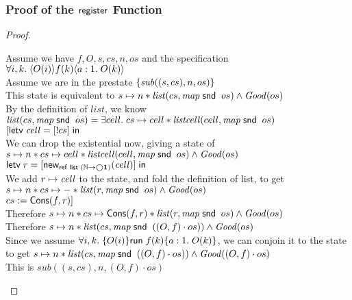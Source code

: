 \subsubsection{Proof of the $\mathsf{register}$ Function}
\begin{proof}
\begin{tabbedproof}
\oo Assume we have $f, O, s, cs, n, os$ and the specification $\forall i,k.\;\langle{O(i)}\rangle{{f(k)}}\langle{a:1}.\;{O(k)}\rangle$ \\
\ooo Assume we are in the prestate $\{{\mathit{sub}((s,cs), n, os)}\}$ \\
\ooo This state is equivalent to $s \mapsto n * \mathit{list}(cs, \mathit{map}\;\mathsf{snd}\;\;os) \land \mathit{Good}(os)$ \\
\ooo By the definition of $\mathit{list}$, we know \\
\ooox $\mathit{list}(cs, \mathit{map}\;\mathsf{snd}\;\;os) = \exists cell.\;cs \mapsto cell * \mathit{listcell}(cell, \mathit{map}\;\mathsf{snd}\;\;os)$ \\
\ooo $[\mathsf{letv}\;\mathit{cell} = [!cs]\;\mathsf{in}\;$ \\
\ooo We can drop the existential now, giving a state of \\
\ooox $s \mapsto n * cs \mapsto cell * \mathit{listcell}(cell, \mathit{map}\;\mathsf{snd}\;\;os) \land \mathit{Good}(os)$ \\
\ooo $\mathsf{letv}\;r = [\mathsf{new}_{\mathsf{ref}\;\mathsf{list}\;{(\mathbb{N} \to \bigcirc{\mathbf{1}})}}(\mathit{cell})]\;\mathsf{in}\;$ \\
\ooo We add $r \mapsto \mathit{cell}$ to the state, and fold the definition of list, to get \\
\ooox $s \mapsto n * cs \mapsto - * \mathit{list}(r, \mathit{map}\;\mathsf{snd}\;\;os) \land \mathit{Good}(os)$ \\ 
\ooo $cs := \mathsf{Cons}(f, r)]$ \\
\ooo Therefore $s \mapsto n * cs \mapsto \mathsf{Cons}(f,r) * \mathit{list}(r, \mathit{map}\;\mathsf{snd}\;\;os) \land \mathit{Good}(os)$ \\ 
\ooo Therefore $s \mapsto n * \mathit{list}(cs, \mathit{map}\;\mathsf{snd}\;\;((O,f) \cdot os)) \land \mathit{Good}(os)$ \\ 
\ooo Since we assume $\forall i,k.\;\{{O(i)}\}{\mathsf{run}\;{f(k)}}\{{a:1}.\;{O(k)}\}$, we can conjoin it to the state \\
\ooox to get $s \mapsto n * \mathit{list}(cs, \mathit{map}\;\mathsf{snd}\;\;((O,f) \cdot os)) \land \mathit{Good}((O,f) \cdot os)$ \\ 
\ooo This is $\mathit{sub}((s,cs), n, (O,f)\cdot os)$
\end{tabbedproof}
\end{proof}

